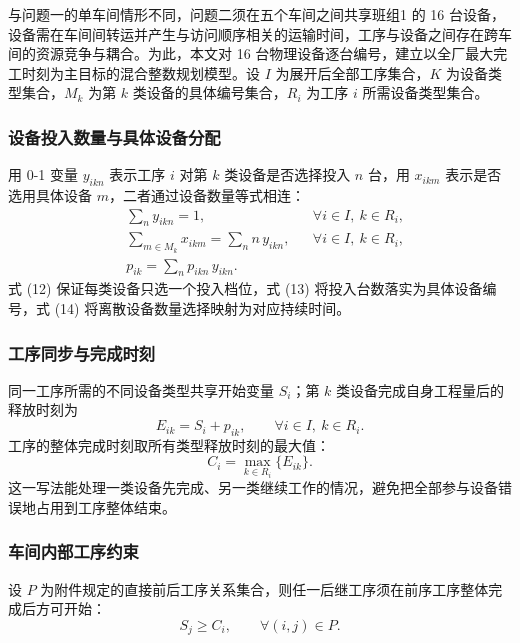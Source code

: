\documentclass[12pt,a4paper]{article}
\begin{document}
与问题一的单车间情形不同，问题二须在五个车间之间共享班组1 的 16 台设备，设备需在车间间转运并产生与访问顺序相关的运输时间，工序与设备之间存在跨车间的资源竞争与耦合。为此，本文对 16 台物理设备逐台编号，建立以全厂最大完工时刻为主目标的混合整数规划模型\cite{mip}。设 $I$ 为展开后全部工序集合，$K$ 为设备类型集合，$M_k$ 为第 $k$ 类设备的具体编号集合，$R_i$ 为工序 $i$ 所需设备类型集合。

\subsubsection{设备投入数量与具体设备分配}

用 0-1 变量 $y_{ikn}$ 表示工序 $i$ 对第 $k$ 类设备是否选择投入 $n$ 台，用 $x_{ikm}$ 表示是否选用具体设备 $m$，二者通过设备数量等式相连：
\begin{align}
&\sum_{n} y_{ikn}=1, && \forall i\in I,\ k\in R_i,\\
&\sum_{m\in M_k} x_{ikm}=\sum_{n} n\,y_{ikn}, && \forall i\in I,\ k\in R_i,\\
&p_{ik}=\sum_{n} p_{ikn}\,y_{ikn}.
\end{align}
式 (12) 保证每类设备只选一个投入档位，式 (13) 将投入台数落实为具体设备编号，式 (14) 将离散设备数量选择映射为对应持续时间。

\subsubsection{工序同步与完成时刻}

同一工序所需的不同设备类型共享开始变量 $S_i$；第 $k$ 类设备完成自身工程量后的释放时刻为
\begin{equation}
E_{ik}=S_i+p_{ik},\qquad \forall i\in I,\ k\in R_i .
\end{equation}
工序的整体完成时刻取所有类型释放时刻的最大值：
\begin{equation}
C_i=\max_{k\in R_i}\{E_{ik}\}.
\end{equation}
这一写法能处理一类设备先完成、另一类继续工作的情况，避免把全部参与设备错误地占用到工序整体结束。

\subsubsection{车间内部工序约束}

设 $P$ 为附件规定的直接前后工序关系集合，则任一后继工序须在前序工序整体完成后方可开始：
\begin{equation}
S_j\ge C_i,\qquad \forall (i,j)\in P .
\end{equation}
\end{document}
